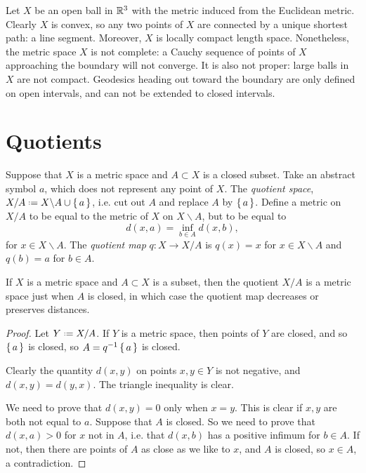 \begin{example}
Let \(X\) be an open ball in \(\mathbb{R}^{3}\) with the metric induced from the Euclidean metric.
Clearly \(X\) is convex, so any two points of \(X\) are connected by a unique shortest path: a line segment.
Moreover, \(X\) is locally compact length space.
Nonetheless, the metric space \(X\) is not complete: a Cauchy sequence of points of \(X\) approaching the boundary will not converge.
It is also not proper: large balls in \(X\) are not compact.
Geodesics heading out toward the boundary are only defined on open intervals, and can not be extended to closed intervals.
\end{example}

\section{Quotients}
Suppose that \(X\) is a metric space and \(A \subset X\) is a closed subset.
Take an abstract symbol \(a\), which does not represent any point of \(X\).
The \emph{quotient space}, \(X/A \defeq X\backslash A \cup \set{a}\), i.e. cut out \(A\) and replace \(A\) by \(\set{a}\).
Define a metric on \(X/A\) to be equal to the metric of \(X\) on \(X\backslash A\), but to be equal to 
\[
d(x,a)=\inf_{b \in A} d(x,b),
\]
for \(x \in X\backslash A\).
The \emph{quotient map} \(q \colon X \to X/A\) is \(q(x)=x\) for \(x \in X\backslash A\) and \(q(b)=a\) for \(b \in A\).
\begin{lemma}\label{lemma:quotient.metric}
If \(X\) is a metric space and \(A \subset X\) is a subset, then the quotient \(X/A\) is a metric space just when \(A\) is closed, in which case the quotient map decreases or preserves distances.
\end{lemma}
\begin{proof}
Let \(Y\defeq X/A\).
If \(Y\) is a metric space, then points of \(Y\) are closed, and so \(\set{a}\) is closed, so \(A=q^{-1}\set{a}\) is closed.

Clearly the quantity \(d(x,y)\) on points \(x,y \in Y\) is not negative, and \(d(x,y)=d(y,x)\).
The triangle inequality is clear.

We need to prove that \(d(x,y)=0\) only when \(x=y\).
This is clear if \(x,y\) are both not equal to \(a\).
Suppose that \(A\) is closed.
So we need to prove that \(d(x,a)>0\) for \(x\) not in \(A\), i.e. that \(d(x,b)\) has a positive infimum for \(b \in A\).
If not, then there are points of \(A\) as close as we like to \(x\), and \(A\) is closed, so \(x \in A\), a contradiction.
\end{proof}
